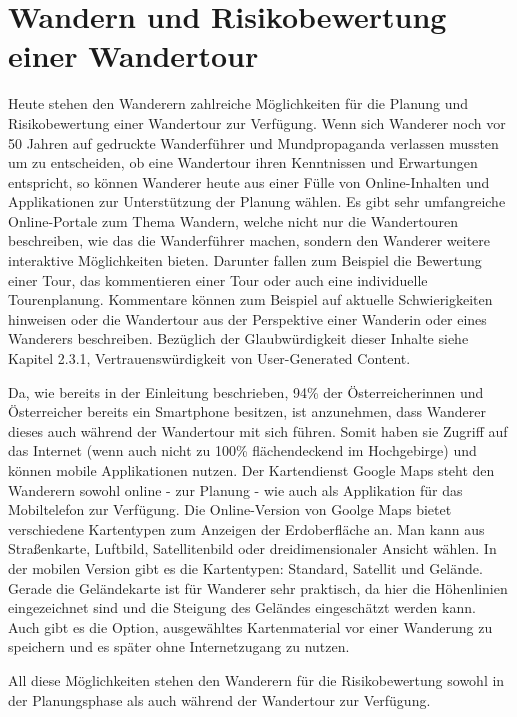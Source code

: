 \section{Wandern und Risikobewertung einer Wandertour}

Heute stehen den Wanderern zahlreiche Möglichkeiten für die Planung und Risikobewertung einer Wandertour zur Verfügung. Wenn sich Wanderer noch vor 50 Jahren auf gedruckte Wanderführer und Mundpropaganda verlassen mussten um zu entscheiden, ob eine Wandertour ihren Kenntnissen und Erwartungen entspricht, so können Wanderer heute aus einer Fülle von Online-Inhalten und Applikationen zur Unterstützung der Planung wählen. Es gibt sehr umfangreiche Online-Portale zum Thema Wandern, welche nicht nur die Wandertouren beschreiben, wie das die Wanderführer machen, sondern den Wanderer  weitere interaktive Möglichkeiten bieten. Darunter fallen zum Beispiel die Bewertung einer Tour, das kommentieren einer Tour oder auch eine individuelle Tourenplanung. Kommentare können zum Beispiel auf aktuelle Schwierigkeiten hinweisen oder die Wandertour aus der Perspektive einer Wanderin oder eines Wanderers beschreiben. Bezüglich der Glaubwürdigkeit dieser Inhalte siehe Kapitel 2.3.1, Vertrauenswürdigkeit von User-Generated Content.

Da, wie bereits in der Einleitung beschrieben, 94\% der Österreicherinnen und Österreicher bereits ein Smartphone besitzen, ist anzunehmen, dass Wanderer dieses auch während der Wandertour mit sich führen. Somit haben sie Zugriff auf das Internet (wenn auch nicht zu 100\% flächendeckend im Hochgebirge) und können mobile Applikationen nutzen. Der Kartendienst Google Maps steht den Wanderern sowohl online - zur Planung -  wie auch als Applikation für das Mobiltelefon zur Verfügung. Die Online-Version von Goolge Maps bietet verschiedene Kartentypen zum Anzeigen der Erdoberfläche an. Man kann aus Straßenkarte, Luftbild, Satellitenbild oder dreidimensionaler Ansicht wählen. In der mobilen Version gibt es die Kartentypen: Standard, Satellit und Gelände. Gerade die Geländekarte ist für Wanderer sehr praktisch, da hier die Höhenlinien eingezeichnet sind und die Steigung des Geländes eingeschätzt werden  kann. Auch gibt es die Option, ausgewähltes Kartenmaterial vor einer Wanderung zu speichern und es später ohne Internetzugang zu nutzen.

All diese Möglichkeiten stehen den Wanderern für die Risikobewertung sowohl in der Planungsphase als auch während der Wandertour zur Verfügung.




